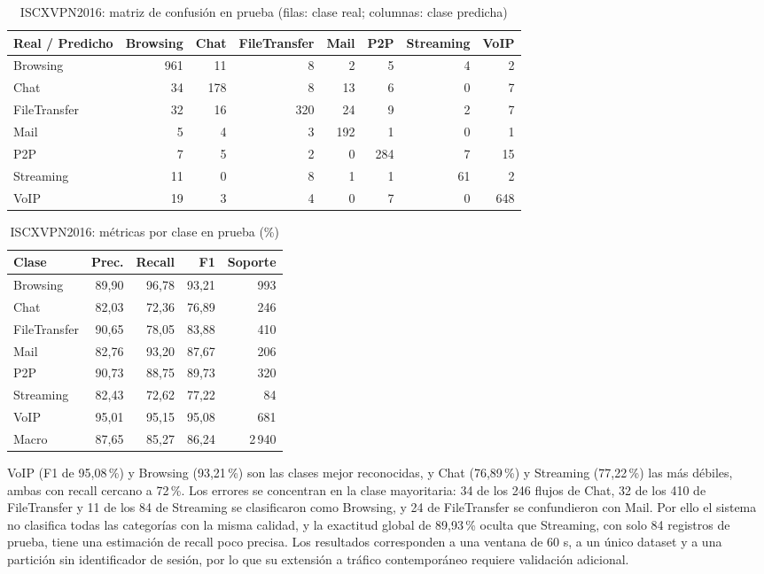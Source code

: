 \documentclass[conference]{IEEEtran}
\begin{document}
\begin{table}[!t]
\centering
\caption{ISCXVPN2016: matriz de confusión en prueba (filas: clase real; columnas: clase predicha)}
\label{tab:conf_iscx}
\small
\begin{tabular}{lrrrrrrr}
\toprule
\textbf{Real / Predicho} & \textbf{Browsing} & \textbf{Chat} & \textbf{FileTransfer} & \textbf{Mail} & \textbf{P2P} & \textbf{Streaming} & \textbf{VoIP} \\
\midrule
Browsing & 961 & 11 & 8 & 2 & 5 & 4 & 2 \\
Chat & 34 & 178 & 8 & 13 & 6 & 0 & 7 \\
FileTransfer & 32 & 16 & 320 & 24 & 9 & 2 & 7 \\
Mail & 5 & 4 & 3 & 192 & 1 & 0 & 1 \\
P2P & 7 & 5 & 2 & 0 & 284 & 7 & 15 \\
Streaming & 11 & 0 & 8 & 1 & 1 & 61 & 2 \\
VoIP & 19 & 3 & 4 & 0 & 7 & 0 & 648 \\
\bottomrule
\end{tabular}
\end{table}

\begin{table}[!tb]
\centering
\footnotesize
\caption{ISCXVPN2016: métricas por clase en prueba (\%)}
\label{tab:clase_iscx}
\begin{tabular}{lrrrr}
\toprule
\textbf{Clase} & \textbf{Prec.} & \textbf{Recall} & \textbf{F1} & \textbf{Soporte} \\
\midrule
Browsing & 89,90 & 96,78 & 93,21 & 993 \\
Chat & 82,03 & 72,36 & 76,89 & 246 \\
FileTransfer & 90,65 & 78,05 & 83,88 & 410 \\
Mail & 82,76 & 93,20 & 87,67 & 206 \\
P2P & 90,73 & 88,75 & 89,73 & 320 \\
Streaming & 82,43 & 72,62 & 77,22 & 84 \\
VoIP & 95,01 & 95,15 & 95,08 & 681 \\
\midrule
Macro & 87,65 & 85,27 & 86,24 & 2\,940 \\
\bottomrule
\end{tabular}
\end{table}

VoIP (F1 de 95,08\,\%) y Browsing (93,21\,\%) son las clases mejor reconocidas, y Chat (76,89\,\%) y Streaming (77,22\,\%) las más débiles, ambas con recall cercano a 72\,\%. Los errores se concentran en la clase mayoritaria: 34 de los 246 flujos de Chat, 32 de los 410 de FileTransfer y 11 de los 84 de Streaming se clasificaron como Browsing, y 24 de FileTransfer se confundieron con Mail. Por ello el sistema no clasifica todas las categorías con la misma calidad, y la exactitud global de 89,93\,\% oculta que Streaming, con solo 84 registros de prueba, tiene una estimación de recall poco precisa. Los resultados corresponden a una ventana de 60 s, a un único dataset y a una partición sin identificador de sesión, por lo que su extensión a tráfico contemporáneo requiere validación adicional.
\end{document}
